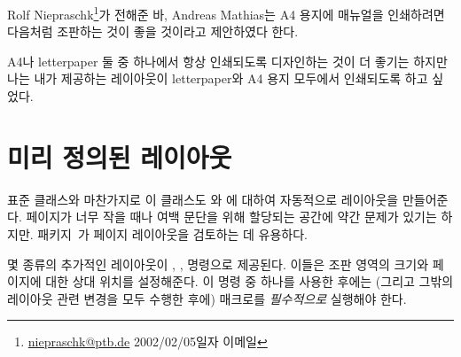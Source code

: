 Rolf Niepraschk\footnote{\url{niepraschk@ptb.de} 2002/02/05일자 이메일}가 전해준 바, Andreas Mathias는 A4 용지에 매뉴얼을 인쇄하려면 다음처럼
조판하는 것이 좋을 것이라고 제안하였다 한다.

A4나 letterpaper 둘 중 하나에서 항상 인쇄되도록 디자인하는 것이 더 좋기는 하지만
나는 내가 제공하는 레이아웃이 letterpaper와 A4 용지 모두에서 인쇄되도록 하고 싶었다.

\section{미리 정의된 레이아웃}
\label{sec:predefined-layouts}


표준 클래스와 마찬가지로 이 클래스도 와 에
대하여 자동적으로 레이아웃을 만들어준다. 페이지가 너무 작을 때나 여백 문단을
위해 할당되는 공간에 약간 문제가 있기는 하지만.  패키지~\cite{LAYOUTS}가 페이지 레이아웃을 검토하는 데 유용하다.

몇 종류의 추가적인 레이아웃이 \cmd{\medievalpage}, \cmd{\isopage}, \cmd{\semiisopage} 명령으로 제공된다. 이들은 조판 영역의 크기와 페이지에 대한 상대 위치를 설정해준다. 
이 명령 중 하나를 사용한 후에는 (그리고 그밖의 레이아웃 관련 변경을 모두 수행한 후에) \cmd{\checkandfixthelayout} 매크로를 \emph{필수적으로} 실행해야 한다.

